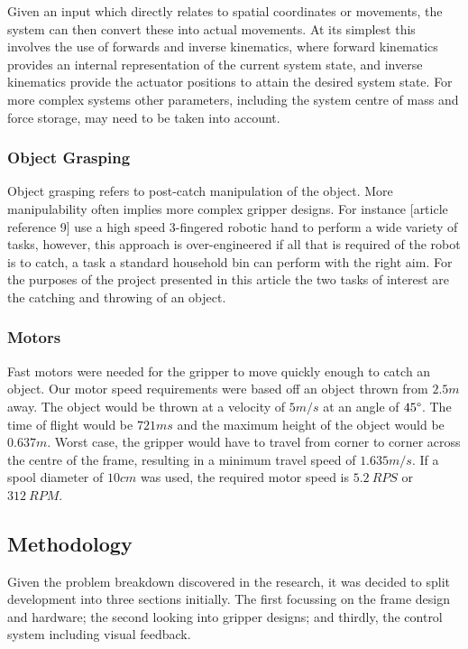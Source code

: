 \documentclass[conference]{IEEEtran}
\begin{document}
	Given an input which directly relates to spatial coordinates or movements, the system can then convert these into actual movements. At its simplest this involves the use of forwards and inverse kinematics, where forward kinematics provides an internal representation of the current system state, and inverse kinematics provide the actuator positions to attain the desired system state. For more complex systems other parameters, including the system centre of mass and force storage, may need to be taken into account. 
	
	\subsubsection{Object Grasping}
	Object grasping refers to post-catch manipulation of the object. More manipulability often implies more complex gripper designs. For instance [article reference 9] use a high speed 3-fingered robotic hand to perform a wide variety of tasks, however, this approach is over-engineered if all that is required of the robot is to catch, a task a standard household bin can perform with the right aim.
	For the purposes of the project presented in this article the two tasks of interest are the catching and throwing of an object.
	
	\subsubsection{Motors}\label{motorSpeedRequired}
	Fast motors were needed for the gripper to move quickly enough to catch an object. Our motor speed requirements were based off an object thrown from $2.5m$ away. The object would be thrown at a velocity of $5m/s$ at an angle of $45\degree$. The time of flight would be $721ms$ and the maximum height of the object would be $0.637m$. Worst case, the gripper would have to travel from corner to corner across the centre of the frame, resulting in a minimum travel speed of $1.635m/s$. If a spool diameter of $10cm$ was used, the required motor speed is $5.2\ RPS$ or $312\ RPM$.
	
		\subsection{Methodology}
		Given the problem breakdown discovered in the research, it was decided to split development into three sections initially. The first focussing on the frame design and hardware; the second looking into gripper designs; and thirdly, the control system including visual feedback.
		
\end{document}
